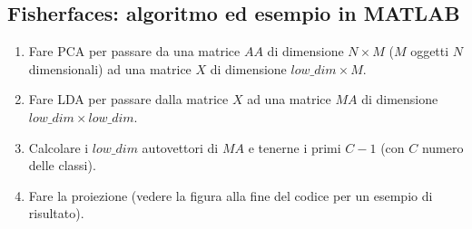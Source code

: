 \documentclass[a4paper,oneside,titlepage]{book}
\begin{document}
\subsection{Fisherfaces: algoritmo ed esempio in MATLAB}
\begin{enumerate}
    \item Fare PCA per passare da una matrice $AA$ di dimensione $N \times M$ ($M$ oggetti $N$ dimensionali) ad una matrice $X$ di dimensione $low\_dim \times M$.
    \item Fare LDA per passare dalla matrice $X$ ad una matrice $MA$ di dimensione $low\_dim \times low\_dim$.
    \item Calcolare i $low\_dim$ autovettori di $MA$ e tenerne i primi $C-1$ (con $C$ numero delle classi).
    \item Fare la proiezione (vedere la figura alla fine del codice per un esempio di risultato).
\end{enumerate}
\end{document}

